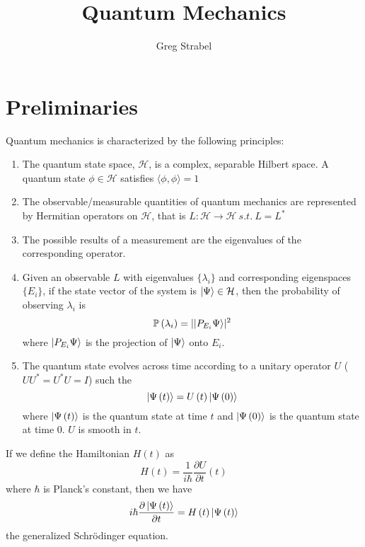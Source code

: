 \documentclass[11pt]{article}
\author{Greg Strabel}
\title{Quantum Mechanics}
\theoremstyle{definition}
\begin{document}
\maketitle
\section{Preliminaries}
Quantum mechanics is characterized by the following principles:
\begin{enumerate}
\item The quantum state space, $\mathcal{H}$, is a complex, separable Hilbert space. A quantum state $\phi \in \mathcal{H}$ satisfies $\langle \phi , \phi \rangle = 1$
\item The observable/measurable quantities of quantum mechanics are represented by Hermitian operators on $\mathcal{H}$, that is $L: \mathcal{H} \rightarrow \mathcal{H} \ s.t. \ L = L^*$
\item The possible results of a measurement are the eigenvalues of the corresponding operator.
\item Given an observable $L$ with eigenvalues $\{\lambda_i\}$ and corresponding eigenspaces $\{E_i\}$, if the state vector of the system is $\ket{\Psi} \in \mathcal{H}$, then the probability of observing $\lambda_i$ is
\begin{equation}
\mathbb{P}\left(\lambda_i\right)=\lvert \ket{P_{E_i} \Psi} \rvert^2
\end{equation}
where $\ket{P_{E_i} \Psi}$ is the projection of $\ket{\Psi}$ onto $E_i$.
\item The quantum state evolves across time according to a unitary operator $U$ ($UU^* = U^*U = I$) such the
\begin{equation}
\ket{\Psi \left( t \right)} = U\left(t\right) \ket{\Psi \left( 0 \right)}
\end{equation}
where $\ket{ \Psi \left( t \right)}$ is the quantum state at time $t$ and $\ket{\Psi \left( 0 \right)}$ is the quantum state at time 0. $U$ is smooth in $t$. 
\end{enumerate}
If we define the Hamiltonian $H\left(t\right)$ as
\begin{equation}
H \left( t \right) = \frac{1}{i \hbar} \frac{\partial U}{\partial t} \left( t \right)
\end{equation}
where $\hbar$ is Planck's constant, then we have
\begin{equation}
i \hbar \frac{\partial \ket{\Psi \left( t \right)}}{\partial t} = H \left( t \right) \ket{\Psi \left( t \right)}
\end{equation}
the generalized Schr\"{o}dinger equation.
\end{document}
